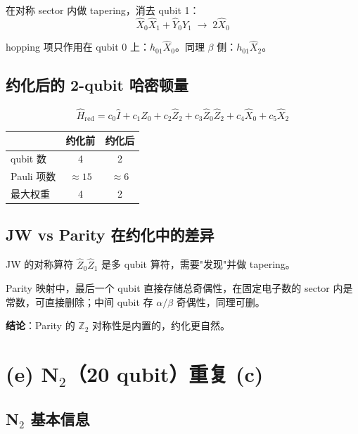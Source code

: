 \documentclass[11pt,a4paper]{article}
\begin{document}
在对称 sector 内做 tapering，消去 qubit 1：
\begin{equation}
  \hat{X}_0\hat{X}_1 + \hat{Y}_0\hat{Y}_1 \;\longrightarrow\; 2\hat{X}_0
\end{equation}

hopping 项只作用在 qubit 0 上：$h_{01}\hat{X}_0$。同理 $\beta$ 侧：$h_{01}\hat{X}_2$。

\subsection{约化后的 2-qubit 哈密顿量}

\begin{equation}
  \boxed{\;
  \hat{H}_{\text{red}} = c_0\hat{I} + c_1\hat{Z}_0 + c_2\hat{Z}_2 + c_3\hat{Z}_0\hat{Z}_2 + c_4\hat{X}_0 + c_5\hat{X}_2\;}
\end{equation}

\begin{center}
\begin{tabular}{lcc}
  \toprule
  & 约化前 & 约化后 \\
  \midrule
  qubit 数 & 4 & 2 \\
  Pauli 项数 & $\approx 15$ & $\approx 6$ \\
  最大权重 & 4 & 2 \\
  \bottomrule
\end{tabular}
\end{center}

\subsection{JW vs Parity 在约化中的差异}

JW 的对称算符 $\hat{Z}_0\hat{Z}_1$ 是多 qubit 算符，需要"发现"并做 tapering。

Parity 映射中，最后一个 qubit 直接存储总奇偶性，在固定电子数的 sector 内是常数，可直接删除；中间 qubit 存 $\alpha/\beta$ 奇偶性，同理可删。

\textbf{结论}：Parity 的 $\mathbb{Z}_2$ 对称性是内置的，约化更自然。

\section{(e) N$_2$（20 qubit）重复 (c)}

\subsection{N$_2$ 基本信息}
\end{document}
